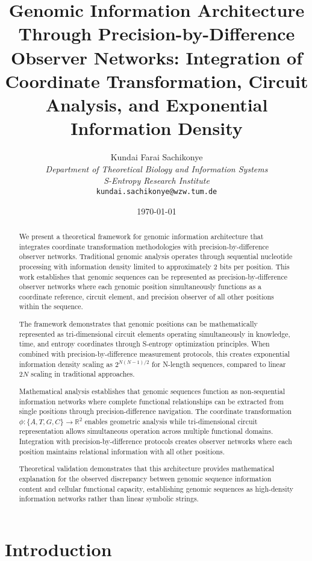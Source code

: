 \documentclass[12pt,a4paper]{article}
\title{\textbf{Genomic Information Architecture Through Precision-by-Difference Observer Networks: Integration of Coordinate Transformation, Circuit Analysis, and Exponential Information Density}}
\author{
Kundai Farai Sachikonye\\
\textit{Department of Theoretical Biology and Information Systems}\\
\textit{S-Entropy Research Institute}\\
\texttt{kundai.sachikonye@wzw.tum.de}
}
\date{\today}
\begin{document}
\maketitle

\begin{abstract}
We present a theoretical framework for genomic information architecture that integrates coordinate transformation methodologies with precision-by-difference observer networks. Traditional genomic analysis operates through sequential nucleotide processing with information density limited to approximately 2 bits per position. This work establishes that genomic sequences can be represented as precision-by-difference observer networks where each genomic position simultaneously functions as a coordinate reference, circuit element, and precision observer of all other positions within the sequence.

The framework demonstrates that genomic positions can be mathematically represented as tri-dimensional circuit elements operating simultaneously in knowledge, time, and entropy coordinates through S-entropy optimization principles. When combined with precision-by-difference measurement protocols, this creates exponential information density scaling as $2^{N(N-1)/2}$ for N-length sequences, compared to linear $2N$ scaling in traditional approaches.

Mathematical analysis establishes that genomic sequences function as non-sequential information networks where complete functional relationships can be extracted from single positions through precision-difference navigation. The coordinate transformation $\phi: \{A,T,G,C\} \rightarrow \mathbb{R}^2$ enables geometric analysis while tri-dimensional circuit representation allows simultaneous operation across multiple functional domains. Integration with precision-by-difference protocols creates observer networks where each position maintains relational information with all other positions.

Theoretical validation demonstrates that this architecture provides mathematical explanation for the observed discrepancy between genomic sequence information content and cellular functional capacity, establishing genomic sequences as high-density information networks rather than linear symbolic strings.
\end{abstract}

\section{Introduction}
\end{document}
